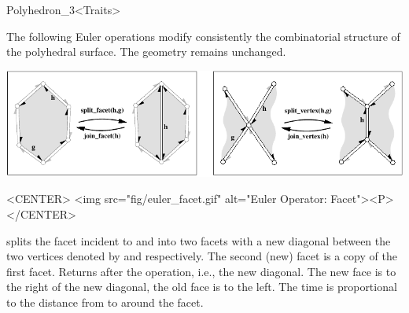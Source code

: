 \begin{ccRefClass}{Polyhedron_3<Traits>}







\label{sectionPolyhedronEuler}


The following Euler operations modify consistently the combinatorial
structure of the polyhedral surface. The geometry remains
unchanged.

\begin{ccTexOnly}
    \begin{center}
      \parbox{\textwidth}{%
          \includegraphics[width=\textwidth]{Polyhedron_ref/fig/euler}%
      }
    \end{center}
\end{ccTexOnly}

\begin{ccHtmlOnly}
    <CENTER>
    <img src="fig/euler_facet.gif" alt="Euler Operator: Facet"><P>
    </CENTER>
\end{ccHtmlOnly}


    {splits the facet incident to  and  into two facets
     with a new diagonal between the two vertices denoted by  and
      respectively. The second (new) facet is a copy of the
     first facet. Returns  after the
     operation, i.e., the new diagonal. The new face is to the right of the
     new diagonal, the old face is to the left. The time is
     proportional to the distance from  to  around the facet.
    }


\end{ccRefClass}
